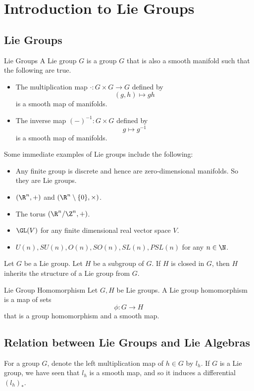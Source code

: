 \documentclass[a4paper]{article}
\begin{document}
\pagebreak
\section{Introduction to Lie Groups}
\subsection{Lie Groups}
\begin{defn}{Lie Groups}{} A Lie group $G$ is a group $G$ that is also a smooth manifold such that the following are true. 
\begin{itemize}
\item The multiplication map $\cdot:G\times G\to G$ defined by $$(g,h)\mapsto gh$$ is a smooth map of manifolds. 
\item The inverse map $(-)^{-1}:G\times G$ defined by $$g\mapsto g^{-1}$$ is a smooth map of manifolds. 
\end{itemize}
\end{defn}

Some immediate examples of Lie groups include the following: 
\begin{itemize}
\item Any finite group is discrete and hence are zero-dimensional manifolds. So they are Lie groups. 
\item $(\R^n,+)$ and $(\R^n\setminus\{0\},\times)$. 
\item The torus $(\R^n/\Z^n,+)$. 
\item $\GL(V)$ for any finite dimensional real vector space $V$. 
\item $U(n), SU(n), O(n), SO(n), SL(n), PSL(n)$ for any $n\in\N$. 
\end{itemize}

\begin{prp}{}{} Let $G$ be a Lie group. Let $H$ be a subgroup of $G$. If $H$ is closed in $G$, then $H$ inherits the structure of a Lie group from $G$. 
\end{prp}

\begin{defn}{Lie Group Homomorphism}{} Let $G,H$ be Lie groups. A Lie group homomorphism is a map of sets $$\phi:G\to H$$ that is a group homomorphism and a smooth map. 
\end{defn}

\subsection{Relation between Lie Groups and Lie Algebras}
For a group $G$, denote the left multiplication map of $h\in G$ by $l_h$. If $G$ is a Lie group, we have seen that $l_h$ is a smooth map, and so it induces a differential $(l_h)_\ast$. 
\end{document}

